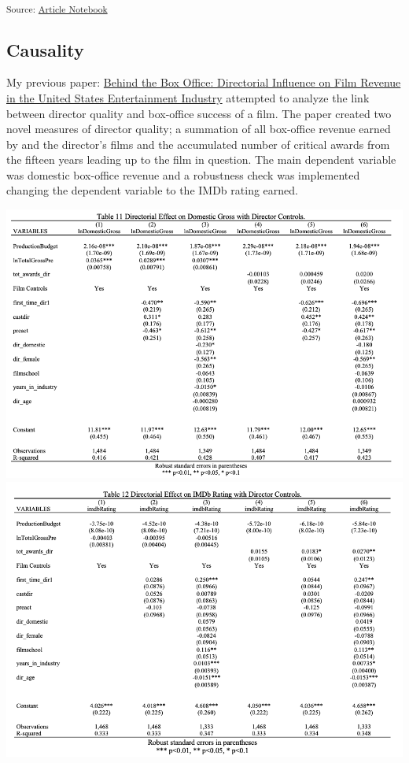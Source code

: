 \documentclass[
]{agujournal2019}
\begin{document}
\textsubscript{Source:
\href{https://ehealy19.github.io/Matching_Movies/index-preview.html}{Article
Notebook}}

\subsection{Causality}\label{causality}

My previous paper: \href{./assets/thesis.pdf}{Behind the Box Office:
Directorial Influence on Film Revenue in the United States Entertainment
Industry} attempted to analyze the link between director quality and
box-office success of a film. The paper created two novel measures of
director quality; a summation of all box-office revenue earned by and
the director's films and the accumulated number of critical awards from
the fifteen years leading up to the film in question. The main dependent
variable was domestic box-office revenue and a robustness check was
implemented changing the dependent variable to the IMDb rating earned.

\includegraphics{./assets/thesis_table1.png}
\includegraphics{./assets/thesis_table2.png}
\end{document}
